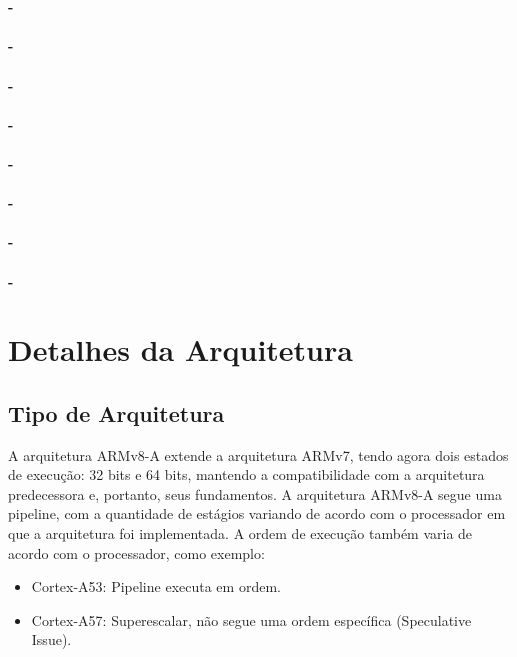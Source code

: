 \documentclass[12pt,a4paper,utf8]{ppgsi}
\begin{document}
\\\\\textbf{-} 
\\\\\textbf{-} 
\\\\\textbf{-} 
\\\\\textbf{-} 
\\\\\textbf{-} 
\\\\\textbf{-} 
\\\\\textbf{-} 
\\\\\textbf{-} 









\section{Detalhes da Arquitetura}
    \subsection{Tipo de Arquitetura}
        A arquitetura ARMv8-A extende a arquitetura ARMv7, tendo agora dois estados de execução: 32 bits e 64 bits, mantendo a compatibilidade com a arquitetura predecessora e, portanto, seus fundamentos.
        A arquitetura ARMv8-A segue uma pipeline, com a quantidade de estágios variando de acordo com o processador em que a arquitetura foi implementada. A ordem de execução também varia de acordo com o processador, como exemplo:
        \begin{itemize}
            \item Cortex-A53: Pipeline executa em ordem.
        \end{itemize}
        \begin{itemize}
            \item Cortex-A57: Superescalar, não segue uma ordem específica (Speculative Issue).
        \end{itemize}
\end{document}
